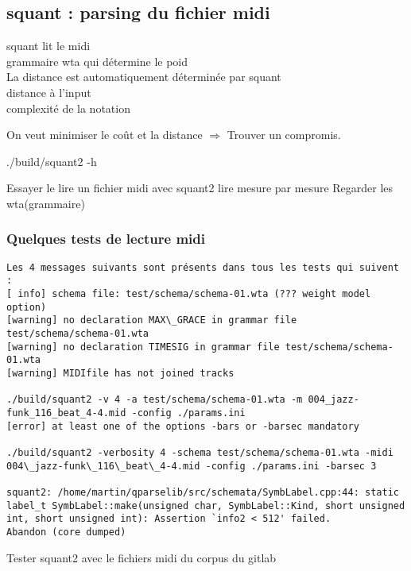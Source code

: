 \subsection{squant : parsing du fichier midi}
squant lit le midi\\
grammaire wta qui détermine le poid\\
La distance est automatiquement déterminée par squant\\
distance à l’input\\
complexité de la notation

On veut minimiser le coût et la distance $\Rightarrow$ Trouver un compromis.

./build/squant2 -h

Essayer le lire un fichier midi avec squant2
lire mesure par mesure
Regarder les wta(grammaire)

\subsubsection{Quelques tests de lecture midi}
\begin{verbatim}
Les 4 messages suivants sont présents dans tous les tests qui suivent :
[ info] schema file: test/schema/schema-01.wta (??? weight model option)
[warning] no declaration MAX\_GRACE in grammar file test/schema/schema-01.wta
[warning] no declaration TIMESIG in grammar file test/schema/schema-01.wta
[warning] MIDIfile has not joined tracks

./build/squant2 -v 4 -a test/schema/schema-01.wta -m 004_jazz-funk_116_beat_4-4.mid -config ./params.ini
[error] at least one of the options -bars or -barsec mandatory

./build/squant2 -verbosity 4 -schema test/schema/schema-01.wta -midi 004\_jazz-funk\_116\_beat\_4-4.mid -config ./params.ini -barsec 3

squant2: /home/martin/qparselib/src/schemata/SymbLabel.cpp:44: static label_t SymbLabel::make(unsigned char, SymbLabel::Kind, short unsigned int, short unsigned int): Assertion `info2 < 512' failed.
Abandon (core dumped)
\end{verbatim}

Tester squant2 avec le fichiers midi du corpus du gitlab\\\\

